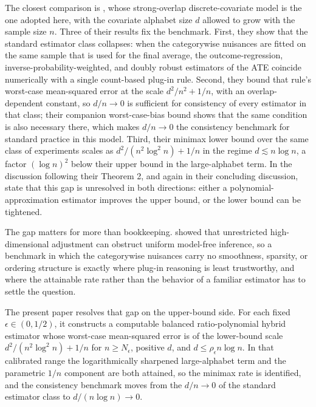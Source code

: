 \documentclass[11pt]{article}
\begin{document}
The closest comparison is \citet{ZengBalakrishnanHanKennedy2024}, whose strong-overlap discrete-covariate model is the one adopted here, with the covariate alphabet size \(d\) allowed to grow with the sample size \(n\). Three of their results fix the benchmark. First, they show that the standard estimator class collapses: when the categorywise nuisances are fitted on the same sample that is used for the final average, the outcome-regression, inverse-probability-weighted, and doubly robust estimators of the ATE coincide numerically with a single count-based plug-in rule. Second, they bound that rule's worst-case mean-squared error at the scale \(d^2/n^2+1/n\), with an overlap-dependent constant, so \(d/n\to0\) is sufficient for consistency of every estimator in that class; their companion worst-case-bias bound shows that the same condition is also necessary there, which makes \(d/n\to0\) the consistency benchmark for standard practice in this model. Third, their minimax lower bound over the same class of experiments scales as \(d^2/(n^2\log^2 n)+1/n\) in the regime \(d\lesssim n\log n\), a factor \((\log n)^2\) below their upper bound in the large-alphabet term. In the discussion following their Theorem 2, and again in their concluding discussion, \citet{ZengBalakrishnanHanKennedy2024} state that this gap is unresolved in both directions: either a polynomial-approximation estimator improves the upper bound, or the lower bound can be tightened.

The gap matters for more than bookkeeping. \citet{RobinsRitov1997} showed that unrestricted high-dimensional adjustment can obstruct uniform model-free inference, so a benchmark in which the categorywise nuisances carry no smoothness, sparsity, or ordering structure is exactly where plug-in reasoning is least trustworthy, and where the attainable rate rather than the behavior of a familiar estimator has to settle the question.

The present paper resolves that gap on the upper-bound side. For each fixed \(\epsilon\in(0,1/2)\), it constructs a computable balanced ratio-polynomial hybrid estimator whose worst-case mean-squared error is of the lower-bound scale \(d^2/(n^2\log^2 n)+1/n\) for \(n\ge N_\epsilon\), positive \(d\), and \(d\le\rho_\epsilon n\log n\). In that calibrated range the logarithmically sharpened large-alphabet term and the parametric \(1/n\) component are both attained, so the minimax rate is identified, and the consistency benchmark moves from the \(d/n\to0\) of the standard estimator class to \(d/(n\log n)\to0\).
\end{document}
